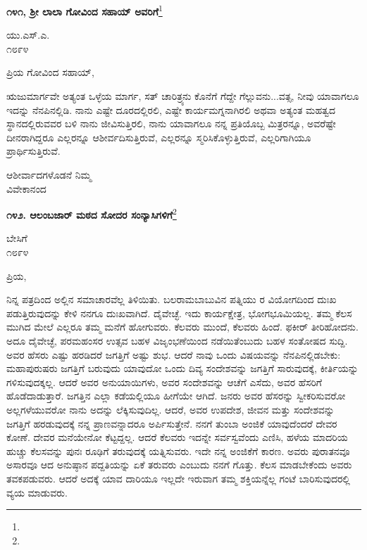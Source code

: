 \begin{center}
\textbf{೧೪೧, ಶ‍್ರೀ ಲಾಲಾ ಗೋವಿಂದ ಸಹಾಯ್ ಅವರಿಗೆ}\footnote{}
\end{center}

\vspace{-0.75cm}

\begin{flushright}
ಯು.ಎಸ್.ಎ.\\೧೮೯೪
\end{flushright}

\vspace{-0.5cm}

\noindent
ಪ್ರಿಯ ಗೋವಿಂದ ಸಹಾಯ್,

ಋಜುಮಾರ್ಗವೇ ಅತ್ಯಂತ ಒಳ್ಳೆಯ ಮಾರ್ಗ, ಸತ್ ಚಾರಿತ್ರ್ಯನು ಕೊನೆಗೆ ಗೆದ್ದೇ ಗೆಲ್ಲುವನು...ವತ್ಸ, ನೀವು ಯಾವಾಗಲೂ ಇದನ್ನು ನೆನಪಿನಲ್ಲಿಡಿ. ನಾನು ಎಷ್ಟೇ ದೂರದಲ್ಲಿ\break ರಲಿ, ಎಷ್ಟೇ ಕಾರ್ಯಮಗ್ನನಾಗಿರಲಿ ಅಥವಾ ಅತ್ಯಂತ ಮಹತ್ವದ ಸ್ಥಾನದಲ್ಲಿರುವವರ ಬಳಿ ನಾನು ಜೀವಿಸುತ್ತಿರಲಿ, ನಾನು ಯಾವಾಗಲೂ ನನ್ನ ಪ್ರತಿಯೊಬ್ಬ ಮಿತ್ರರನ್ನೂ, ಅವರೆಷ್ಟೇ ದೀನರಾಗಿದ್ದರೂ ಎಲ್ಲರನ್ನೂ ಆಶೀರ್ವದಿಸುತ್ತಿರುವೆ, ಎಲ್ಲರನ್ನೂ ಸ್ಮರಿಸಿಕೊಳ್ಳುತ್ತಿರುವೆ, ಎಲ್ಲರಿಗಾಗಿಯೂ ಪ್ರಾರ್ಥಿಸುತ್ತಿರುವೆ.

\vspace{-0.5cm}

{\flushright
ಆಶೀರ್ವಾದಗಳೊಡನೆ ನಿಮ್ಮ\\ವಿವೇಕಾನಂದ\par}

\begin{center}
\textbf{೧೪೨. ಆಲಂಬಜಾರ್‌ ಮಠದ ಸೋದರ ಸಂನ್ಯಾಸಿಗಳಿಗೆ}\footnote{}
\end{center}

\vspace{-0.5cm}

\begin{flushright}
ಬೇಸಿಗೆ\\೧೮೯೪
\end{flushright}

\vspace{-0.5cm}

\noindent
ಪ್ರಿಯ,

ನಿನ್ನ ಪತ್ರದಿಂದ ಅಲ್ಲಿನ ಸಮಾಚಾರವೆಲ್ಲ ತಿಳಿಯಿತು. ಬಲರಾಮಬಾಬುವಿನ ಪತ್ನಿಯು\enginline{-} ರ ವಿಯೋಗದಿಂದ ದುಃಖ ಪಡುತ್ತಿರುವುದನ್ನು ಕೇಳಿ ನನಗೂ ದುಃಖವಾಗಿದೆ. ದೈವೇಚ್ಛೆ. ಇದು ಕಾರ್ಯಕ್ಷೇತ್ರ, ಭೋಗಭೂಮಿಯಲ್ಲ. ತಮ್ಮ ಕೆಲಸ ಮುಗಿದ ಮೇಲೆ ಎಲ್ಲರೂ ತಮ್ಮ ಮನೆಗೆ ಹೋಗುವರು. ಕೆಲವರು ಮುಂದೆ, ಕೆಲವರು ಹಿಂದೆ. ಫಕೀರ್ ತೀರಿಹೋದನು. ಅದೂ ದೈವೇಚ್ಛೆ, ಪರಮಹಂಸರ ಉತ್ಸವ ಬಹಳ ವಿಜೃಂಭಣೆಯಿಂದ ನಡೆಯಿತೆಂಬುದು ಬಹಳ ಸಂತೋಷದ ಸುದ್ದಿ. ಅವರ ಹೆಸರು ಎಷ್ಟು ಹರಡಿದರೆ ಜಗತ್ತಿಗೆ ಅಷ್ಟು ಶುಭ. ಆದರೆ ನಾವು ಒಂದು ವಿಷಯವನ್ನು ನೆನಪಿನಲ್ಲಿಡಬೇಕು: ಮಹಾಪುರುಷರು ಜಗತ್ತಿಗೆ ಬರುವುದು ಯಾವುದೋ ಒಂದು ದಿವ್ಯ ಸಂದೇಶವನ್ನು ಜಗತ್ತಿಗೆ ಸಾರುವುದಕ್ಕೆ, ಕೀರ್ತಿಯನ್ನು ಗಳಿಸುವುದಕ್ಕಲ್ಲ. ಆದರೆ ಅವರ ಅನುಯಾಯಿಗಳು, ಅವರ ಸಂದೇಶವನ್ನು ಆಚೆಗೆ ಎಸೆದು, ಅವರ ಹೆಸರಿಗೆ ಹೊಡೆದಾಡುತ್ತಾರೆ. ಜಗತ್ತಿನ ಎಲ್ಲಾ ಕಡೆಯಲ್ಲಿಯೂ ಹೀಗೆಯೇ ಆಗಿದೆ. ಜನರು ಅವರ ಹೆಸರನ್ನು ಸ್ವೀಕರಿಸುವರೋ ಅಲ್ಲಗಳೆಯುವರೋ ನಾನು ಅದನ್ನು ಲೆಕ್ಕಿಸುವುದಿಲ್ಲ. ಆದರೆ, ಅವರ ಉಪದೇಶ, ಜೀವನ ಮತ್ತು ಸಂದೇಶವನ್ನು ಜಗತ್ತಿಗೆ ಹರಡುವುದಕ್ಕೆ ನನ್ನ ಪ್ರಾಣವನ್ನಾದರೂ ಅರ್ಪಿಸುತ್ತೇನೆ. ನನಗೆ ತುಂಬಾ ಅಂಜಿಕೆ ಯಾವುದೆಂದರೆ ದೇವರ ಕೋಣೆ. ದೇವರ ಮನೆಯೇನೋ ಕೆಟ್ಟದ್ದಲ್ಲ. ಆದರೆ ಕೆಲವರು ಇದನ್ನೇ ಸರ್ವಸ್ವವೆಂದು ಎಣಿಸಿ, ಹಳೆಯ ಮಾದರಿಯ ಹುಚ್ಚು ಕೆಲಸವನ್ನು ಪುನಃ ರೂಢಿಗೆ ತರುವುದಕ್ಕೆ ಯತ್ನಿಸುವರು. ಇದೇ ನನ್ನ ಅಂಜಿಕೆಗೆ ಕಾರಣ. ಅವರು ಪುರಾತನವೂ ಅಸಾರವೂ ಆದ ಅನುಷ್ಠಾನ ಪದ್ದತಿಯನ್ನು ಏಕೆ ತರುವರು ಎಂಬುದು ನನಗೆ ಗೊತ್ತು. ಕೆಲಸ ಮಾಡಬೇಕೆಂದು ಅವರು ತವಕಪಡುವರು. ಆದರೆ ಅದಕ್ಕೆ ಯಾವ ದಾರಿಯೂ ಇಲ್ಲದೇ ಇರುವಾಗ ತಮ್ಮ ಶಕ್ತಿಯನ್ನೆಲ್ಲ ಗಂಟೆ ಬಾರಿಸುವುದರಲ್ಲಿ ವ್ಯಯ ಮಾಡುವರು.


